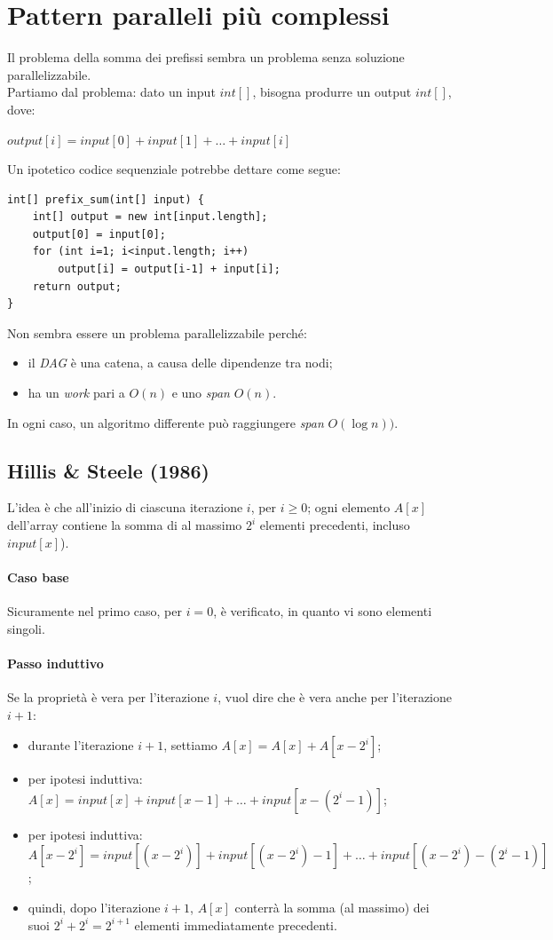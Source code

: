 \section{Pattern paralleli più complessi}
Il problema della somma dei prefissi sembra un problema senza soluzione parallelizzabile. \\
Partiamo dal problema: dato un input $int[]$, bisogna produrre un output $int[]$, dove:
\begin{center}
	$output[i] = input[0] + input[1] + \ldots + input[i]$
\end{center}
Un ipotetico codice sequenziale potrebbe dettare come segue:
\begin{lstlisting}
int[] prefix_sum(int[] input) {
	int[] output = new int[input.length];
	output[0] = input[0];
	for (int i=1; i<input.length; i++)
		output[i] = output[i-1] + input[i];
	return output;
}
\end{lstlisting}
Non sembra essere un problema parallelizzabile perché:
\begin{itemize}
	\item il \textit{DAG} è una catena, a causa delle dipendenze tra nodi;
	\item ha un \textit{work} pari a $O(n)$ e uno \textit{span} $O(n)$.
\end{itemize}
In ogni caso, un algoritmo differente può raggiungere \textit{span} $O(\log{n}))$.

\subsection{Hillis \& Steele (1986)}
L'idea è che all'inizio di ciascuna iterazione $i$, per $i \geq 0$; ogni elemento $A[x]$ dell'array contiene la somma di al massimo $2^{i}$ elementi precedenti, incluso $input[x]$).

\newpage

\paragraph{Caso base}
Sicuramente nel primo caso, per $i=0$, è verificato, in quanto vi sono elementi singoli.
\paragraph{Passo induttivo}
Se la proprietà è vera per l'iterazione $i$, vuol dire che è vera anche per l'iterazione $i+1$:
\begin{itemize}
	\item durante l'iterazione $i+1$, settiamo $A[x] = A[x] + A[x-2^{i}]$;
	\item per ipotesi induttiva: $A[x] = input[x] + input[x-1] + \ldots + input[x-(2^{i}-1)]$;
	\item per ipotesi induttiva: $A[x-2^{i}] = input[(x-2^{i})] + input[(x-2^{i})-1] + \ldots + input[(x-2^{i})-(2^{i}-1)]$;
	\item quindi, dopo l'iterazione $i+1$, $A[x]$ conterrà la somma (al massimo) dei suoi $2^{i} + 2^{i} = 2^{i+1}$ elementi immediatamente precedenti.
\end{itemize}

